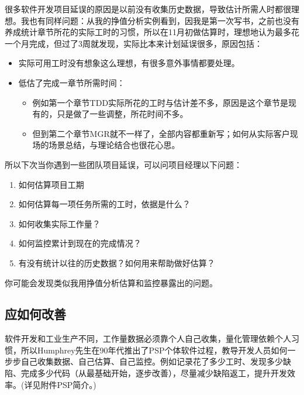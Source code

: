 很多软件开发项目延误的原因是以前没有收集历史数据，导致估计所需人时都很理想。我也有同样问题：从我的挣值分析实例看到，因我是第一次写书，之前也没有养成统计章节所花的实际工时的习惯，所以在11月初做估算时，理想地认为最多花一个月完成，但过了3周就发现，实际比本来计划延误很多，原因包括：

\begin{itemize}
\tightlist
\item
  实际可用工时没有想象这么理想，有很多意外事情都要处理。
\item
  低估了完成一章节所需时间：

  \begin{itemize}
  \tightlist
  \item
    例如第一个章节TDD实际所花的工时与估计差不多，原因是这个章节是现有的，只是做了一些调整，所花时间不多。
  \item
    但到第二个章节MGR就不一样了，全部内容都重新写；如何从实际客户现场的场景总结，与理论结合也很花心思。
  \end{itemize}
\end{itemize}

所以下次当你遇到一些团队项目延误，可以问项目经理以下问题：

\begin{enumerate}
\tightlist
\item
  如何估算项目工期\\
\item
  如何估算每一项任务所需的工时，依据是什么？\\
\item
  如何收集实际工作量？\\
\item
  如何监控累计到现在的完成情况？\\
\item
  有没有统计以往的历史数据？如何用来帮助做好估算？\\
\end{enumerate}

你可能会发现类似我用挣值分析估算和监控暴露出的问题。

\hypertarget{ux5e94ux8be5ux5982ux4f55ux6539ux5584}{%
\subsection{应如何改善}\label{ux5e94ux8be5ux5982ux4f55ux6539ux5584}}

软件开发和工业生产不同，工作量数据必须靠个人自己收集，量化管理依赖个人习惯，所以Humphrey先生在90年代推出了PSP个体软件过程，教导开发人员如何一步步自己收集数据、自己估算、自己监控。例如记录花了多少工时、发现多少缺陷、完成多少代码（从最基础开始，逐步改善），尽量减少缺陷返工，提升开发效率。(详见附件PSP简介。)

